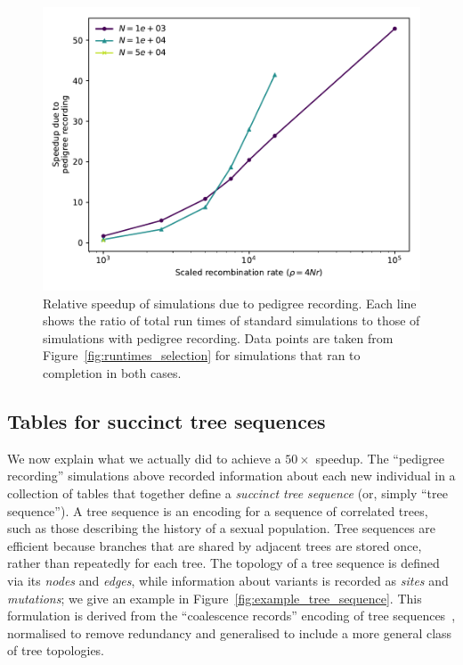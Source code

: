 \documentclass{article}
\begin{document}
\begin{figure}
    \includegraphics[]{sims/speedup}
    \caption{
        \label{fig:relative_speedup_selection}
        Relative speedup of simulations due to pedigree recording.
        Each line shows the ratio of total run times of standard simulations to
        those of simulations with pedigree recording.
        Data points are taken from Figure~\ref{fig:runtimes_selection}
        for simulations that ran to completion in both cases.
    }
\end{figure}




\subsection*{Tables for succinct tree sequences}

We now explain what we actually did to achieve a $50\times$ speedup.
The ``pedigree recording'' simulations above recorded information about each new individual
in a collection of tables that together define a \emph{succinct tree sequence}
(or, simply ``tree sequence'').
A {tree sequence} is an encoding for a sequence of correlated trees,
such as those describing the history of a sexual population.
Tree sequences are efficient because branches that are shared by adjacent trees are stored once,
rather than repeatedly for each tree.
The topology of a tree sequence is defined via its \emph{nodes} and \emph{edges},
while information about variants is recorded as \emph{sites} and \emph{mutations};
we give an example in Figure~\ref{fig:example_tree_sequence}.
This formulation is derived from the ``coalescence records'' encoding of tree
sequences~\citep{kelleher2016efficient}, normalised to remove redundancy
and generalised to include a more general class of tree topologies.
\end{document}
